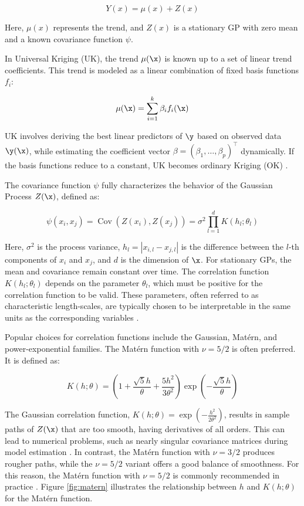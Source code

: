 \documentclass [PhD] {package/uclathes}
\begin{document}
\begin{equation}
    Y(x) = \mu(x) + Z(x)
\end{equation}

Here, \(\mu(x)\) represents the trend, and \(Z(x)\) is a stationary GP with zero mean and a known covariance function \(\psi\).

In Universal Kriging (UK), the trend \(\mu(\x)\) is known up to a set of linear trend coefficients. This trend is modeled as a linear combination of fixed basis functions \(f_i\):

\[
\mu(\x) = \sum_{i=1}^k \beta_i f_i(\x)
\]

UK involves deriving the best linear predictors of \(\y\) based on observed data \(\y(\x)\), while estimating the coefficient vector \(\beta = (\beta_1, \dots, \beta_p)^\top\) dynamically. If the basis functions reduce to a constant, UK becomes ordinary Kriging (OK) \parencite{roustant2012dicekriging}.

The covariance function \(\psi\) fully characterizes the behavior of the Gaussian Process \(Z(\x)\), defined as:

\begin{equation}
\psi(x_i, x_j) = \operatorname{Cov} \left( Z(x_i), Z(x_j) \right) = \sigma^2 \prod_{l=1}^{d} K(h_l ; \theta_l)
\end{equation}

Here, \(\sigma^2\) is the process variance, \(h_l = |x_{i,l} - x_{j,l}|\) is the difference between the \(l\)-th components of \(x_i\) and \(x_j\), and \(d\) is the dimension of \(\x\). For stationary GPs, the mean and covariance remain constant over time. The correlation function \(K(h_l ; \theta_l)\) depends on the parameter \(\theta_l\), which must be positive for the correlation function to be valid. These parameters, often referred to as characteristic length-scales, are typically chosen to be interpretable in the same units as the corresponding variables \parencite{rasmussen2006gaussian}.

Popular choices for correlation functions include the Gaussian, Mat\'ern, and power-exponential families. The Mat\'ern function with \(\nu = 5/2\) is often preferred. It is defined as:

\[
K(h; \theta) = \left( 1 + \frac{\sqrt{5} h}{\theta} + \frac{5 h^2}{3 \theta^2} \right) \exp \left( -\frac{\sqrt{5} h}{\theta} \right)
\]

The Gaussian correlation function, \(K(h; \theta) = \exp \left( -\frac{h^2}{2\theta^2} \right)\), results in sample paths of \(Z(\x)\) that are too smooth, having derivatives of all orders. This can lead to numerical problems, such as nearly singular covariance matrices during model estimation \parencite{martin2005use}. In contrast, the Mat\'ern function with \(\nu = 3/2\) produces rougher paths, while the \(\nu = 5/2\) variant offers a good balance of smoothness. For this reason, the Mat\'ern function with \(\nu = 5/2\) is commonly recommended in practice \parencite{martin2005use}. Figure \ref{fig:matern} illustrates the relationship between \(h\) and \(K(h; \theta)\) for the Mat\'ern function.
\end{document}

